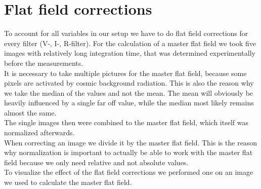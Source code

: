 \section{Flat field corrections}
To account for all variables in our setup we have to do flat field corrections for every filter (V-, I-, R-filter). 
For the calculation of a master flat field we took five images with relatively long integration time, that was determined experimentally before the measurements. \\
It is necessary to take multiple pictures for the master flat field, because some pixels are activated by cosmic background radiation.
This is also the reason why we take the median of the values and not the mean. 
The mean will obviously be heavily influenced by a single far off value, while the median most likely remains almost the same. \\
The single images then were combined to the master flat field, which itself was normalized afterwards.\\
When correcting an image we divide it by the master flat field.
This is the reason why normalization is important to actually be able to work with the master flat field because we only need relative  and not absolute values. \\
To visualize the effect of the flat field corrections we performed one on an image we used to calculate the master flat field.\\
